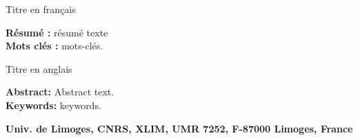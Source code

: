 \newpage
\thispagestyle{watermark}
\null
\clearpage

\newpage
\thispagestyle{empty}
\null
\clearpage

\newpage
\pagestyle{empty}
\onehalfspacing

{}
\begin{tcolorbox}[colback=redxlim,
				  colframe=redxlim,
				  fontupper=\color{white}]
\centering
Titre en français
\end{tcolorbox}

\textbf{Résumé :} résumé texte\\

\textbf{Mots clés :} mots-clés.\\[3mm]

\begin{tcolorbox}[colback=redxlim,
				  colframe=redxlim,
				  fontupper=\color{white}]
\centering
Titre en anglais
\end{tcolorbox}

\textbf{Abstract:} Abstract text.\\

\textbf{Keywords:} keywords.

\begin{center}
\vfill
\textbf{Univ. de Limoges, CNRS, XLIM, UMR 7252, F-87000 Limoges, France}
\end{center}

